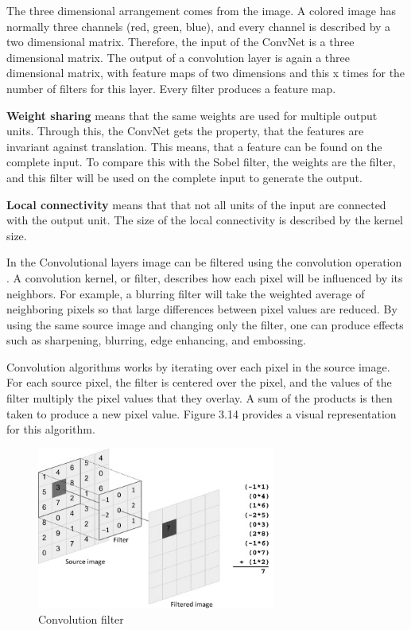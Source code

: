 The three dimensional arrangement comes from the image. A colored image has normally three channels (red, green, blue), and every channel is described by a two dimensional matrix. Therefore, the input of the ConvNet is a three dimensional matrix. The output of a convolution layer is again a three dimensional matrix, with feature maps of two dimensions and this x times for the number of filters for this layer. Every filter produces a feature map. 

\textbf{Weight sharing} means that the same weights are used for multiple output units.  Through this, the ConvNet gets the property, that the features are invariant against translation. This means, that a feature can be found on the complete input. To compare this with the Sobel filter, the weights are the filter, and this filter will be used on the complete input to generate the output.

\textbf{Local connectivity} means that that not all units of the input are connected with the output unit. The size of the local connectivity is described by the kernel size.

In the Convolutional layers image can be filtered using the convolution operation \cite{marr1980theory}. A convolution kernel, or filter, describes how each pixel will be influenced by its neighbors. For example, a blurring filter will take the weighted average of neighboring pixels so that large differences between pixel values are reduced. By using the same source image and changing only the filter, one can produce effects such as sharpening, blurring, edge enhancing, and embossing.

Convolution algorithms works by iterating over each pixel in the source image. For each source pixel, the filter is centered over the pixel, and the values of the filter multiply the pixel values that they overlay. A sum of the products is then taken to produce a new pixel value. Figure 3.14 provides a visual representation for this algorithm. 
\begin{figure}[h]
	\includegraphics[width=0.7\textwidth]{Figures/Section3_Convfilter.jpg} 
	\centering
	\caption{Convolution filter}
	\label{fig:Convfilter}
\end{figure}

